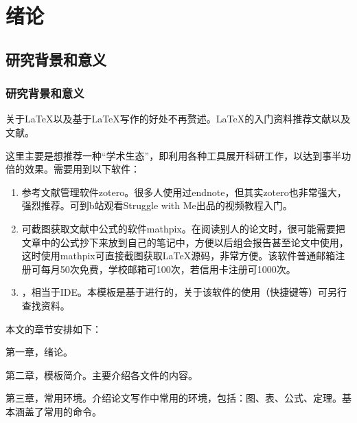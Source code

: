 \chapter{绪论}
%
\section{研究背景和意义}
\subsection{研究背景和意义}
%
关于\LaTeX{}以及基于\LaTeX{}写作的好处不再赘述。\LaTeX{}的入门资料推荐文献\parencite{_b}以及文献\parencite{_c}。

这里主要是想推荐一种“学术生态”，即利用各种工具展开科研工作，以达到事半功倍的效果。需要用到以下软件：
\begin{enumerate}
	\item 	参考文献管理软件zotero\cite{_f}。很多人使用过endnote，但其实zotero也非常强大，强烈推荐。可到b站观看Struggle with Me出品的视频教程\cite{_e}入门。
	\item	可截图获取文献中公式的软件mathpix\cite{_d}。在阅读别人的论文时，很可能需要把文章中的公式抄下来放到自己的笔记中，方便以后组会报告甚至论文中使用，这时使用mathpix可直接截图获取\LaTeX{}源码，非常方便。该软件普通邮箱注册可每月50次免费，学校邮箱可100次，若信用卡注册可1000次。	
	\item	{}，相当于IDE。本模板是基于进行的，关于该软件的使用（快捷键等）可另行查找资料。
\end{enumerate}

本文的章节安排如下：

第一章，绪论。

第二章，模板简介。主要介绍各文件的内容。

第三章，常用环境。介绍论文写作中常用的环境，包括：图、表、公式、定理。基本涵盖了常用的命令。




